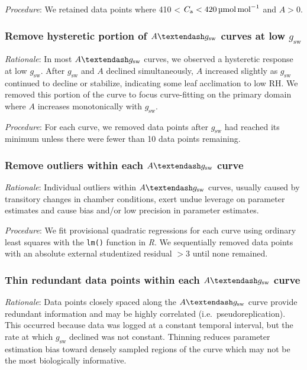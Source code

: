 \documentclass[
  letterpaper,
  DIV=11,
  numbers=noendperiod]{scrartcl}
\newcommand{\agcurve}{$A \textendash g_\text{sw}$}
\newcommand{\cabetween}[2]{#1 < $C_\mathrm{a} < \qty{#2}{\micro\mol\raiseto{-1}\mol}$}
\newcommand{\gsw}{$g_\text{sw}$}
\newcommand{\rh}{$\mathrm{RH}$}
\begin{document}
\emph{Procedure}: We retained data points where \cabetween{410}{420} and
\(A> 0\).

\subsubsection{\texorpdfstring{Remove hysteretic portion of \agcurve{}
curves at low
\gsw{}}{Remove hysteretic portion of  curves at low }}\label{remove-hysteretic-portion-of-curves-at-low}

\emph{Rationale}: In most \agcurve{} curves, we observed a hysteretic
response at low \gsw. After \gsw{} and \(A\) declined simultaneously,
\(A\) increased slightly as \gsw{} continued to decline or stabilize,
indicating some leaf acclimation to low \rh. We removed this portion of
the curve to focus curve-fitting on the primary domain where \(A\)
increases monotonically with \gsw{}.

\emph{Procedure}: For each curve, we removed data points after \gsw{}
had reached its minimum unless there were fewer than 10 data points
remaining.

\subsubsection{\texorpdfstring{Remove outliers within each \agcurve{}
curve}{Remove outliers within each  curve}}\label{remove-outliers-within-each-curve}

\emph{Rationale}: Individual outliers within \agcurve{} curves, usually
caused by transitory changes in chamber conditions, exert undue leverage
on parameter estimates and cause bias and/or low precision in parameter
estimates.

\emph{Procedure}: We fit provisional quadratic regressions for each
curve using ordinary least squares with the \texttt{lm()} function in
\emph{R}. We sequentially removed data points with an absolute external
studentized residual \(> 3\) until none remained.

\subsubsection{\texorpdfstring{Thin redundant data points within each
\agcurve{}
curve}{Thin redundant data points within each  curve}}\label{thin-redundant-data-points-within-each-curve}

\emph{Rationale}: Data points closely spaced along the \agcurve{} curve
provide redundant information and may be highly correlated
(i.e.~pseudoreplication). This occurred because data was logged at a
constant temporal interval, but the rate at which \gsw{} declined was
not constant. Thinning reduces parameter estimation bias toward densely
sampled regions of the curve which may not be the most biologically
informative.
\end{document}
